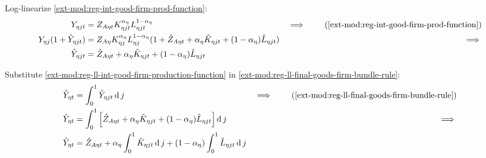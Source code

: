 \documentclass[../thesis.tex]{subfiles}
\begin{document}
Log-linearize \ref{ext-mod:reg-int-good-firm-prod-function}:
\begin{alignat}{2}
	Y_{\eta jt} &= Z_{A\eta t} K_{\eta jt}^{\alpha_{\eta}} L_{\eta jt}^{1-\alpha_{\eta}} &\implies \tag{\ref{ext-mod:reg-int-good-firm-prod-function}} \\
	Y_{\eta j} (1+ \hat{Y}_{\eta jt}) &= Z_{A\eta} K_{\eta j}^{\alpha_{\eta}} L_{\eta j}^{1-\alpha_{\eta}} (1+ \hat{Z}_{A\eta t} + {\alpha_{\eta}} \hat{K}_{\eta jt} + (1-\alpha_{\eta}) \hat{L}_{\eta jt}) &\implies \nonumber \\
	\hat{Y}_{\eta jt} &= \hat{Z}_{A\eta t} + {\alpha_{\eta}} \hat{K}_{\eta jt} + (1-\alpha_{\eta}) \hat{L}_{\eta jt} \label{ext-mod:reg-ll-int-good-firm-production-function}
\end{alignat}

Substitute \ref{ext-mod:reg-ll-int-good-firm-production-function} in \ref{ext-mod:reg-ll-final-goods-firm-bundle-rule}:
\begin{alignat}{2}
	\hat{Y}_{\eta t} &= \int_{0}^{1} \hat{Y}_{\eta jt} \dif j &\implies \tag{\ref{ext-mod:reg-ll-final-goods-firm-bundle-rule}} \\
	\hat{Y}_{\eta t} &= \int_{0}^{1} \left[ \hat{Z}_{A\eta t} + {\alpha_{\eta}} \hat{K}_{\eta jt} + (1-\alpha_{\eta}) \hat{L}_{\eta jt} \right] \dif j &\implies \nonumber \\
	\hat{Y}_{\eta t} &= \hat{Z}_{A\eta t} + {\alpha_{\eta}} \int_{0}^{1} \hat{K}_{\eta jt} \dif j + (1-\alpha_{\eta}) \int_{0}^{1} \hat{L}_{\eta jt} \dif j \label{ext-mod:reg-ll-final-goods-firm-bundle-rule-2}
\end{alignat}

\begin{comment}
	
Log-linearize \ref{ext-mod:reg-int-good-firm-prod-function}:
\begin{alignat}{2}
	Y_{\eta jt} &= Z_{A\eta t} L_{\eta jt} &\implies \tag{\ref{ext-mod:reg-int-good-firm-prod-function}} \\
	\hat{Y}_{\eta jt} &= \hat{Z}_{A\eta t} + \hat{L}_{\eta jt} %
\end{alignat}	

Substitute \ref{ext-mod:reg-ll-int-good-firm-production-function} in \ref{ext-mod:reg-ll-final-goods-firm-bundle-rule}:
\begin{alignat}{2}
	\hat{Y}_{\eta t} &= \int_{0}^{1} \hat{Y}_{\eta jt} \dif j &\implies \tag{\ref{ext-mod:reg-ll-final-goods-firm-bundle-rule}} \\
	\hat{Y}_{\eta t} &= \hat{Z}_{A\eta t} + \int_{0}^{1} \hat{L}_{\eta jt} \dif j \label{ext-mod:reg-ll-final-goods-firm-bundle-rule-2}
\end{alignat}
	
\end{comment}
\end{document}
